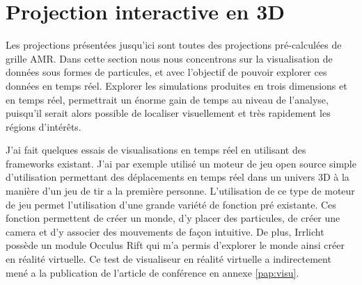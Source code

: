 \section{Projection interactive en 3D}
%
%
%


Les projections présentées jusqu'ici sont toutes des projections pré-calculées de grille \ac{AMR}.
Dans cette section nous nous concentrons sur la visualisation de données sous formes de particules, et avec l'objectif de pouvoir explorer ces données en temps réel. 
Explorer les simulations produites en trois dimensions et en temps réel, permettrait un énorme gain de temps au niveau de l'analyse, puisqu'il serait alors possible de localiser visuellement et très rapidement les régions d’intérêts.

J'ai fait quelques essais de visualisations en temps réel en utilisant des frameworks existant.
J'ai par exemple utilisé \cite{Irrlicht} un moteur de jeu open source simple d'utilisation permettant des déplacements en temps réel dans un univers 3D à la manière d'un jeu de tir a la première personne.
L'utilisation de ce type de moteur de jeu permet l'utilisation d'une grande variété de fonction pré existante.
Ces fonction permettent de créer un monde, d'y placer des particules, de créer une camera et d'y associer des mouvements de façon intuitive.
De plus, Irrlicht possède un module Occulus Rift qui m'a permis d'explorer le monde ainsi créer en réalité virtuelle.
Ce test de visualiseur en réalité virtuelle a indirectement mené a la publication de l'article de conférence en annexe \ref{pap:visu}.


